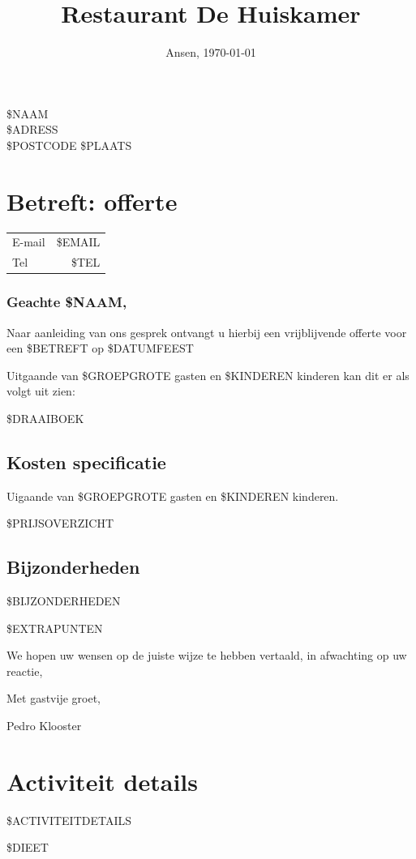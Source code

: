 \documentclass{scrartcl}
\begin{document}

\title{Restaurant De Huiskamer}
\date{Ansen, \today}
\maketitle
\thispagestyle{footer}

\begin{flushright}
	\$NAAM \\
	\$ADRESS \\
	\$POSTCODE \$PLAATS
\end{flushright}
\section*{Betreft: offerte}
\begin{tabular}{l r}
  E-mail & \$EMAIL  \\
  Tel & \$TEL  \\
\end{tabular}

\subsubsection*{Geachte \$NAAM,}

Naar aanleiding van ons gesprek ontvangt u hierbij een vrijblijvende offerte
voor een \$BETREFT op \$DATUMFEEST

Uitgaande van \$GROEPGROTE gasten en \$KINDEREN kinderen kan dit er als volgt uit zien:

\$DRAAIBOEK

\newpage

\subsection*{Kosten specificatie}
Uigaande van \$GROEPGROTE gasten en \$KINDEREN kinderen.

\$PRIJSOVERZICHT

\subsection*{Bijzonderheden}

\$BIJZONDERHEDEN

\$EXTRAPUNTEN

We hopen uw wensen op de juiste wijze te hebben vertaald, in afwachting op uw reactie,

Met gastvije groet,

Pedro Klooster

\newpage

\section*{Activiteit details}

\$ACTIVITEITDETAILS

\$DIEET
\end{document}
